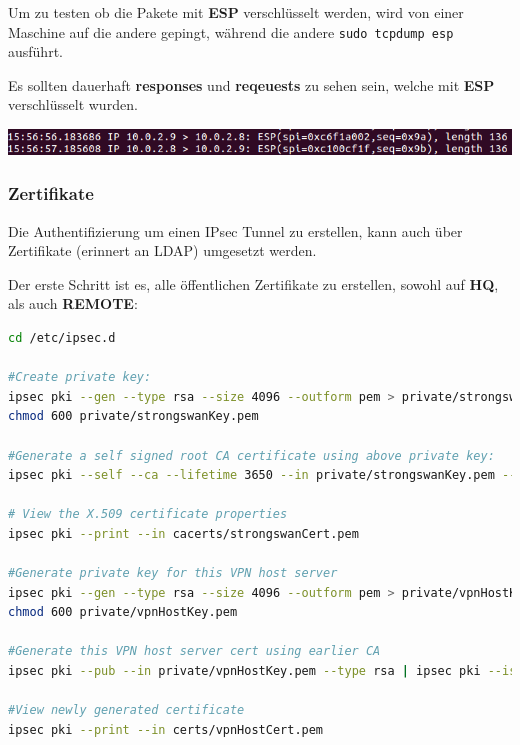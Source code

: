 Um zu testen ob die Pakete mit \textbf{ESP} verschlüsselt werden, wird von einer Maschine auf die andere gepingt, während die andere \verb|sudo tcpdump esp| ausführt.

Es sollten dauerhaft \textbf{responses} und \textbf{reqeuests} zu sehen sein, welche mit \textbf{ESP} verschlüsselt wurden. 

\begin{minipage}{\linewidth}
	\centering
	\includegraphics[width=0.8\linewidth]{images/tcpdump}
\end{minipage}

\subsubsection{Zertifikate}
Die Authentifizierung um einen IPsec Tunnel zu erstellen, kann auch über Zertifikate (erinnert an LDAP) umgesetzt werden.

Der erste Schritt ist es, alle öffentlichen Zertifikate zu erstellen, sowohl auf \textbf{HQ}, als auch \textbf{REMOTE}:

\begin{lstlisting}[language=bash]
cd /etc/ipsec.d

#Create private key:
ipsec pki --gen --type rsa --size 4096 --outform pem > private/strongswanKey.pem
chmod 600 private/strongswanKey.pem

#Generate a self signed root CA certificate using above private key:
ipsec pki --self --ca --lifetime 3650 --in private/strongswanKey.pem --type rsa --dn "C=Kim, O=Kim, CN=Kim Root CA" --outform pem > cacerts/strongswanCert.pem

# View the X.509 certificate properties
ipsec pki --print --in cacerts/strongswanCert.pem

#Generate private key for this VPN host server
ipsec pki --gen --type rsa --size 4096 --outform pem > private/vpnHostKey.pem
chmod 600 private/vpnHostKey.pem

#Generate this VPN host server cert using earlier CA
ipsec pki --pub --in private/vpnHostKey.pem --type rsa | ipsec pki --issue --lifetime 730 --cacert cacerts/strongswanCert.pem --cakey private/strongswanKey.pem --dn "C=Kim, O=Kim, CN=vpn.example.com.sg" --san vpn.example.com.sg --san vpn2.example.com.sg --san xx.xxx.xxx.xxx --san @xx.xxx.xxx.xxx --flag serverAuth --flag ikeIntermediate --outform pem > certs/vpnHostCert.pem

#View newly generated certificate
ipsec pki --print --in certs/vpnHostCert.pem
\end{lstlisting}

